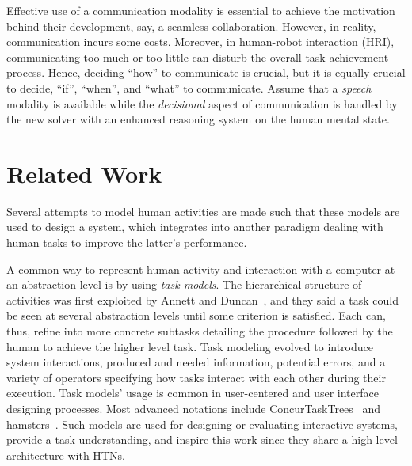 \documentclass[letterpaper]{article} %
\begin{document}
Effective use of a communication modality is essential to achieve the motivation behind their development, say, a seamless collaboration. However, in reality, communication incurs some costs. 
Moreover, in human-robot interaction (HRI), communicating too much or too little can disturb the overall task achievement process. 
Hence, deciding ``how'' to communicate is crucial, but it is equally crucial to decide, ``if'', ``when'', and ``what'' to communicate. 
Assume that a \textit{speech} modality is available while the 
\textit{decisional} aspect of communication is handled by the new solver with an enhanced reasoning system on the human mental state.
%


\section{Related Work}

Several attempts to model human activities are made such that these models are used to design a system, which integrates into another paradigm dealing with human tasks to improve the latter's performance. 

A common way to represent human activity and interaction with a computer at an abstraction level is by using \textit{task models}. The hierarchical structure of activities was first exploited by Annett and Duncan~\citeyear{annett1967task}, and they said a task could be seen at several abstraction levels until some criterion is satisfied. Each can, thus, refine into more concrete subtasks detailing the procedure followed by the human to achieve the higher level task.
Task modeling evolved to introduce system interactions, produced and needed information, potential errors, and a variety of operators specifying how tasks interact with each other during their execution. Task models' usage is common in user-centered and user interface designing processes. Most advanced notations include {\sc ConcurTaskTrees}~\cite{paterno2004concurtasktrees} and {\sc hamsters}~\cite{martinie2019analysing}.
Such models are used for designing or evaluating interactive systems, provide a task understanding, and inspire this work since they share a high-level architecture with HTNs. 
\end{document}
